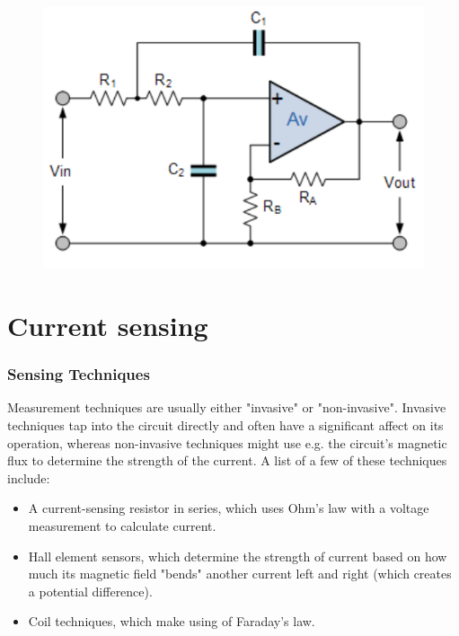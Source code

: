 \begin{figure}[!h]
\begin{minipage}{.23\textwidth}
        \label{fig:opamp-instrumentation}
    \end{minipage}
    \begin{minipage}{.23\textwidth}
        \centering
        \includegraphics[width=0.8\linewidth]{Figures/Op-Amp_Non-Inverting_Filter}
        \label{fig:opamp-non-inverting-filter}
    \end{minipage}    

\end{figure}

\pagebreak
\section{Current sensing}\label{sec:cursens}

\subsubsection{Sensing Techniques}\label{sec:cur_sum}
Measurement techniques are usually either "invasive" or "non-invasive". Invasive techniques tap into the circuit directly and often have a significant affect
on its operation, whereas non-invasive techniques might use e.g. the circuit's magnetic flux to determine the strength of the current.
A list of a few of these techniques \cite{WebsiteHiokiUSA} include:
\begin{itemize}
    \item A current-sensing resistor in series, which uses Ohm's law with a voltage measurement to calculate current.
    \item Hall element sensors, which determine the strength of current based on how much its magnetic field "bends" another current left and right (which creates a potential difference).
    \item Coil techniques, which make using of Faraday's law.
\end{itemize}

